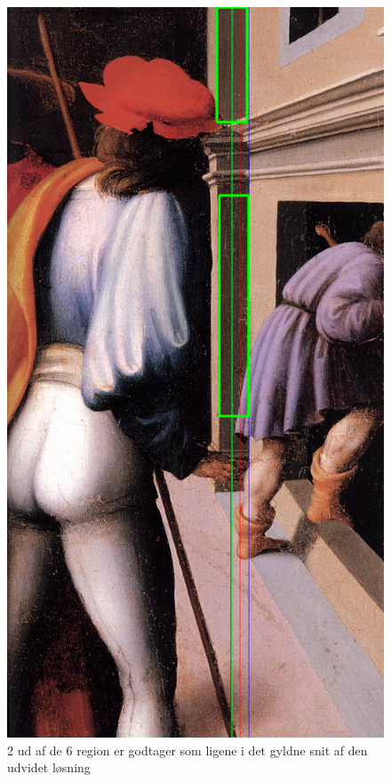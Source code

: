 \begin{figure}[h!!]
	\begin{center}
		\includegraphics[scale=0.3,angle=0]{afsnit/afprovning/billeder/udvidet_losning/udvidet_kfarver_sdetaljer.png}
	\end{center}
	\caption[]{2 ud af de 6 region er godtager som ligene i det gyldne snit af den udvidet løsning}
	\label{udvidet_virker1}
\end{figure}

